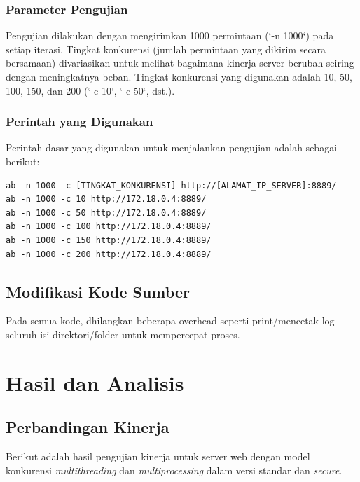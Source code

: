 \documentclass[12pt]{article}
\begin{document}
\subsubsection{Parameter Pengujian}

Pengujian dilakukan dengan mengirimkan 1000 permintaan (`-n 1000`) pada setiap iterasi. Tingkat konkurensi (jumlah permintaan yang dikirim secara bersamaan) divariasikan untuk melihat bagaimana kinerja server berubah seiring dengan meningkatnya beban. Tingkat konkurensi yang digunakan adalah 10, 50, 100, 150, dan 200 (`-c 10`, `-c 50`, dst.).

\subsubsection{Perintah yang Digunakan}

Perintah dasar yang digunakan untuk menjalankan pengujian adalah sebagai berikut:

\begin{verbatim}
ab -n 1000 -c [TINGKAT_KONKURENSI] http://[ALAMAT_IP_SERVER]:8889/
ab -n 1000 -c 10 http://172.18.0.4:8889/
ab -n 1000 -c 50 http://172.18.0.4:8889/
ab -n 1000 -c 100 http://172.18.0.4:8889/
ab -n 1000 -c 150 http://172.18.0.4:8889/
ab -n 1000 -c 200 http://172.18.0.4:8889/
\end{verbatim}

\subsection{Modifikasi Kode Sumber}

Pada semua kode, dhilangkan beberapa overhead seperti print/mencetak log seluruh isi direktori/folder untuk mempercepat proses.



\newpage
\section{Hasil dan Analisis}
\subsection{Perbandingan Kinerja}
Berikut adalah hasil pengujian kinerja untuk server web dengan model konkurensi \textit{multithreading} dan \textit{multiprocessing} dalam versi standar dan \textit{secure}.
\end{document}

